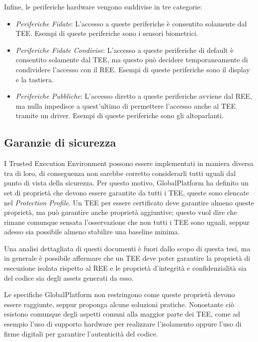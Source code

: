 \documentclass[12pt,italian]{report}
\begin{document}
\bigbreak

\noindent Infine, le periferiche hardware vengono suddivise in tre categorie:
\begin{itemize}
    \item \textit{Periferiche Fidate}: L'accesso a queste periferiche è
    consentito solamente dal TEE. Esempi di queste periferiche sono i
    sensori biometrici. 
    \item \textit{Periferiche Fidate Condivise}: L'accesso a queste
    periferiche di default è consentito solamente dal TEE, ma questo può
    decidere temporaneamente di condividere l'accesso con il REE. Esempi di
    queste periferiche sono il display e la tastiera.
    \item \textit{Periferiche Pubbliche}: L'accesso diretto a queste
    periferiche avviene dal REE, ma nulla impedisce a quest'ultimo di
    permettere l'accesso anche al TEE tramite un driver. Esempi di queste
    periferiche sono gli altoparlanti.
\end{itemize}

\subsection{Garanzie di sicurezza}
\label{subsec:garanzie-sicurezza}
I Trusted Execution Environment possono essere implementati in maniera
diversa tra di loro, di conseguenza non sarebbe corretto considerarli tutti
uguali dal punto di vista della sicurezza.
Per questo motivo, GlobalPlatform ha definito un set di proprietà che
devono essere garantite da tutti i TEE, queste sono elencate nel
\textit{Protection Profile}\cite{gp2020protectionprofile}.
Un TEE per essere certificato deve garantire almeno queste proprietà, ma
può garantire anche proprietà aggiuntive; questo vuol dire che rimane
comunque sensata l'osservazione che non tutti i TEE sono uguali, seppur
adesso sia possibile almeno stabilire una baseline minima. 

Una analisi dettagliata di questi documenti è fuori dallo scopo di questa
tesi, ma in generale è possibile affermare che un TEE deve poter garantire
la proprietà di esecuzione isolata rispetto al REE e le proprietà d'integrità
e confidenzialità sia del codice sia degli assets generati da esso.

Le specifiche GlobalPlatform non restringono come queste proprietà devono
essere raggiunte, seppur proponga alcune soluzioni pratiche.
Nonostante ciò esistono comunque degli aspetti comuni alla maggior parte dei
TEE, come ad esempio l'uso di supporto hardware per realizzare l'isolamento
oppure l'uso di firme digitali per garantire l'autenticità del codice.
\end{document}
